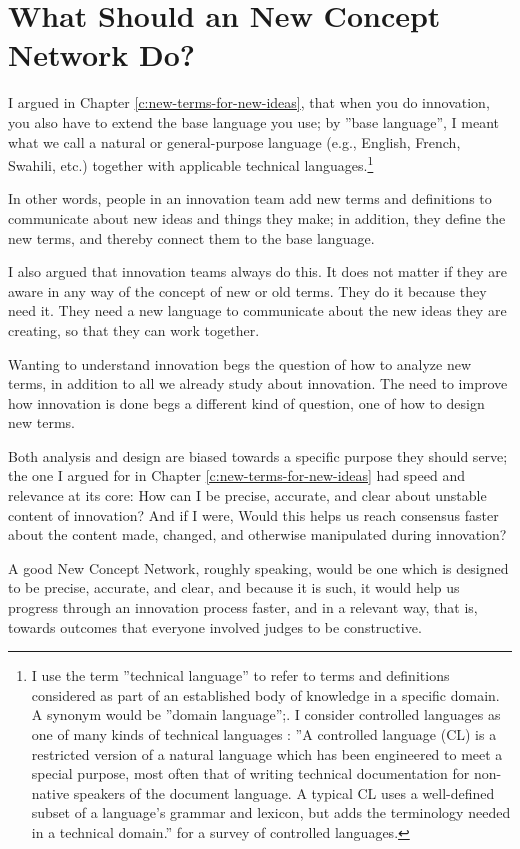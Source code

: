 \documentclass[graybox,envcountchap,sectrefs]{svmono}
\newcommand{\ncnf}{New Concept Network}
\begin{document}
\section{What Should an \ncnf{} Do?}
\label{c2:s1}
I argued in Chapter \ref{c:new-terms-for-new-ideas}, that when you do innovation, you also have to extend the base language you use; by ''base language'', I meant what we call a natural or general-purpose language (e.g., English, French, Swahili, etc.) together with applicable technical languages.\footnote{I use the term ''technical language'' to refer to terms and definitions considered as part of an established body of knowledge in a specific domain. A synonym would be ''domain language'';. I consider controlled languages as one of many kinds of technical languages \cite{Kittredge2012}: ''A controlled language (CL) is a restricted version of a natural language which has been engineered to meet a special purpose, most often that of writing technical documentation for non-native speakers of the document language. A typical CL uses a well-defined subset of a language's grammar and lexicon, but adds the terminology needed in a technical domain.'' \cite{Kuhn2014} for a survey of controlled languages.}

In other words, people in an innovation team add new terms and definitions to communicate about new ideas and things they make; in addition, they define the new terms, and thereby connect them to the base language. 

I also argued that innovation teams always do this. It does not matter if they are aware in any way of the concept of new or old terms. They do it because they need it. They need a new language to communicate about the new ideas they are creating, so that they can work together.

Wanting to understand innovation begs the question of how to analyze new terms, in addition to all we already study about innovation. The need to improve how innovation is done begs a different kind of question, one of how to design new terms.

Both analysis and design are biased towards a specific purpose they should serve; the one I argued for in Chapter \ref{c:new-terms-for-new-ideas} had speed and relevance at its core: How can I be precise, accurate, and clear about unstable content of innovation? And if I were, Would this helps us reach consensus faster about the content made, changed, and otherwise manipulated during innovation?

A good \ncnf, roughly speaking, would be one which is designed to be precise, accurate, and clear, and because it is such, it would help us progress through an innovation process faster, and in a relevant way, that is, towards outcomes that everyone involved judges to be constructive. 
\end{document}
